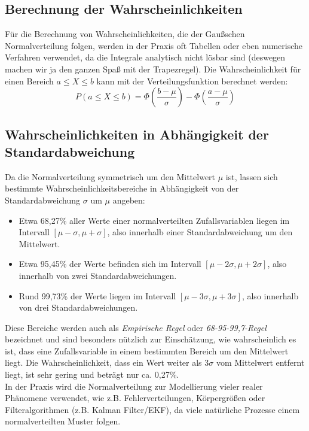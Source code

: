 \subsection*{Berechnung der Wahrscheinlichkeiten}
Für die Berechnung von Wahrscheinlichkeiten, die der Gaußschen Normalverteilung folgen, werden in der Praxis oft Tabellen oder eben numerische Verfahren verwendet, da die Integrale analytisch nicht lösbar sind (deswegen machen wir ja den ganzen Spaß mit der Trapezregel). Die Wahrscheinlichkeit für einen Bereich $a \leq X \leq b$ kann mit der Verteilungsfunktion berechnet werden:
\[
P(a \leq X \leq b) = \Phi\left(\frac{b - \mu}{\sigma}\right) - \Phi\left(\frac{a - \mu}{\sigma}\right)
\]

\subsection*{Wahrscheinlichkeiten in Abhängigkeit der Standardabweichung}

Da die Normalverteilung symmetrisch um den Mittelwert $\mu$ ist, lassen sich bestimmte Wahrscheinlichkeitsbereiche in Abhängigkeit von der Standardabweichung $\sigma$ um $\mu$ angeben:

\begin{itemize}
    \item Etwa 68,27\% aller Werte einer normalverteilten Zufallsvariablen liegen im Intervall $[\mu - \sigma, \mu + \sigma]$, also innerhalb einer Standardabweichung um den Mittelwert.
    \item Etwa 95,45\% der Werte befinden sich im Intervall $[\mu - 2\sigma, \mu + 2\sigma]$, also innerhalb von zwei Standardabweichungen.
    \item Rund 99,73\% der Werte liegen im Intervall $[\mu - 3\sigma, \mu + 3\sigma]$, also innerhalb von drei Standardabweichungen.
\end{itemize}
Diese Bereiche werden auch als \textit{Empirische Regel} oder \textit{68-95-99,7-Regel} bezeichnet und sind besonders nützlich zur Einschätzung, wie wahrscheinlich es ist, dass eine Zufallsvariable in einem bestimmten Bereich um den Mittelwert liegt. Die Wahrscheinlichkeit, dass ein Wert weiter als $3\sigma$ vom Mittelwert entfernt liegt, ist sehr gering und beträgt nur ca. 0,27\%. \\
In der Praxis wird die Normalverteilung zur Modellierung vieler realer Phänomene verwendet, wie z.B. Fehlerverteilungen, Körpergrößen oder Filteralgorithmen (z.B. Kalman Filter/EKF), da viele natürliche Prozesse einem normalverteilten Muster folgen. \cite{skript_statistik} \cite{normaldistribution}


